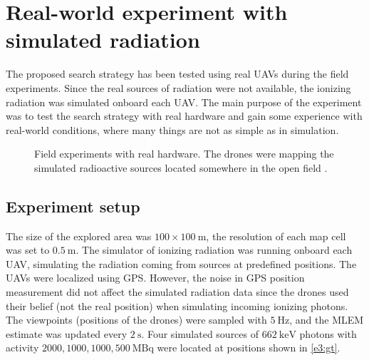 \section{Real-world experiment with simulated radiation\label{chap:exp3}}
The proposed search strategy has been tested using real \ac{UAV}s during the field experiments.
Since the real sources of radiation were not available, the ionizing radiation was simulated onboard each \ac{UAV}.
The main purpose of the experiment was to test the search strategy with real hardware and gain some experience with real-world conditions, where many things are not as simple as in simulation.
\begin{figure}[!htb]
  \centering
  \caption{Field experiments with real hardware. The drones \protect{} were mapping the simulated radioactive sources located somewhere in the open field \protect{}.}
  \label{fig:}
\end{figure}
\subsection{Experiment setup}
The size of the explored area was $100 \times 100\ \si{\meter}$, the resolution of each map cell was set to $\SI{0.5}{\meter}$.
The simulator of ionizing radiation was running onboard each \ac{UAV}, simulating the radiation coming from sources at predefined positions.
The \ac{UAV}s were localized using \ac{GPS}.
However, the noise in \ac{GPS} position measurement did not affect the simulated radiation data since the drones used their belief (not the real position) when simulating incoming ionizing photons.
The viewpoints (positions of the drones) were sampled with $\SI{5}{\hertz}$, and the \ac{MLEM} estimate was updated every $\SI{2}{\second}$.
Four simulated sources of $\SI{662}{\kilo\electronvolt}$ photons with activity $2000, 1000, 1000, 500\ \si{\mega\becquerel}$ were located at positions shown in  \ref{e3:gt}.

